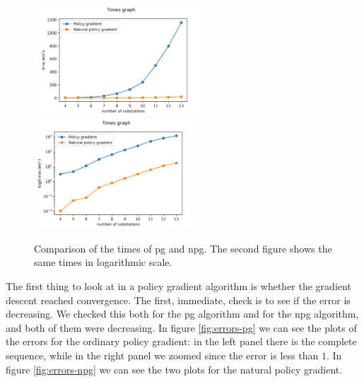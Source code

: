 \begin{figure}[t]
    \centering
    \mbox{
        \hspace*{-19.5pt}\includegraphics[width=0.55\textwidth]{chapters/figures/times_graph.png}
        \hspace*{-19.5pt}\includegraphics[width=0.55\textwidth]{chapters/figures/times_graph_log.png}
    }
    \caption{Comparison of the times of \acrshort{pg} and \acrshort{npg}. The second figure shows the same times in logarithmic scale.}
    \label{fig:times}
\end{figure}

The first thing to look at in a policy gradient algorithm is whether the gradient descent reached convergence. The first, immediate, check is to see if the error is decreasing. We checked this both for the \acrshort{pg} algorithm and for the \acrshort{npg} algorithm, and both of them were decreasing. In figure \autoref{fig:errors-pg} we can see the plots of the errors for the ordinary policy gradient: in the left panel there is the complete sequence, while in the right panel we zoomed since the error is less than $1$. In figure \autoref{fig:errors-npg} we can see the two plots for the natural policy gradient.

